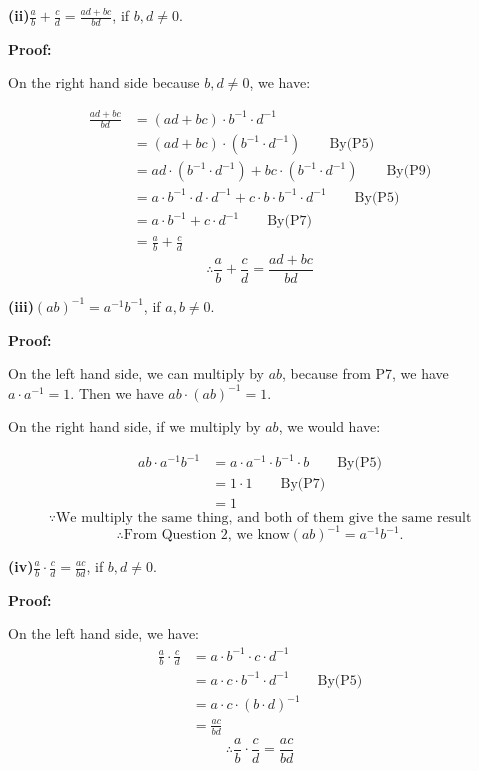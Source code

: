 \documentclass[a4paper,12pt]{report}
\begin{document}
\noindent
\textbf{(ii)}$\frac{a}{b} + \frac{c}{d}=\frac{ad+bc}{bd}$, if $b,d\neq 0$.

\noindent
\textbf{Proof:}

\noindent
On the right hand side because $b,d\neq 0$, we have:

\begin{align*}
 \frac{ad+bc}{bd} & = (ad+bc)\cdot{b^{-1}}\cdot{d^{-1}}\\
 			   & = (ad+bc)\cdot({b^{-1}}\cdot{d^{-1}})\qquad \text{By(P5)}\\
 			   & = ad\cdot({b^{-1}}\cdot{d^{-1}}) + bc\cdot({b^{-1}}\cdot{d^{-1}})\qquad \text{By(P9)}\\
 			   & = a\cdot{b^{-1}}\cdot{d}\cdot{d^{-1}} + c\cdot{b}\cdot{b^{-1}}\cdot{d^{-1}}\qquad \text{By(P5)}\\
 			   & = a \cdot{b^{-1}} + c\cdot{d^{-1}}\qquad \text{By(P7)}\\
 			   & = \frac{a}{b} + \frac{c}{d}
\end{align*}
\[\therefore \frac{a}{b} + \frac{c}{d}=\frac{ad+bc}{bd}\]

\noindent
\textbf{(iii)}$(ab)^{-1}=a^{-1}b^{-1}$, if $a,b\neq 0$.

\noindent
\textbf{Proof:}

\noindent
On the left hand side, we can multiply by $ab$, because from P7, we have $a\cdot{a^{-1}=1}$.  Then we have $ab\cdot{(ab)^{-1}}=1$.

\noindent
On the right hand side, if we multiply by $ab$, we would have:

\begin{align*}
 ab\cdot{a^{-1}b^{-1}} & = a\cdot{a^{-1}}\cdot{b^{-1}}\cdot{b} \qquad \text{By(P5)} \\
 			   & = 1\cdot{1} \qquad \text{By(P7)}\\
 			   & = 1
\end{align*}
\[\because \text{We multiply the same thing, and both of them give the same result}\]
\[\therefore \text{From Question 2, we know} (ab)^{-1}=a^{-1}b^{-1}. \]

\noindent
\textbf{(iv)}$\frac{a}{b} \cdot{ \frac{c}{d}}=\frac{ac}{bd}$, if $b,d\neq 0$.

\noindent
\textbf{Proof:}

\noindent
On the left hand side, we have:
\begin{align*}
 \frac{a}{b} \cdot{ \frac{c}{d}} & = a\cdot{b^{-1}}\cdot {c}\cdot{d^{-1}} \\
 			   & = a\cdot {c}\cdot{b^{-1}}\cdot{d^{-1}} \qquad \text{By(P5)}\\
 			   & = a\cdot {c}\cdot({b}\cdot{d})^{-1}\\
 			   & = \frac{ac}{bd}
\end{align*}
\[\therefore \frac{a}{b} \cdot{ \frac{c}{d}}=\frac{ac}{bd} \]
\end{document}

